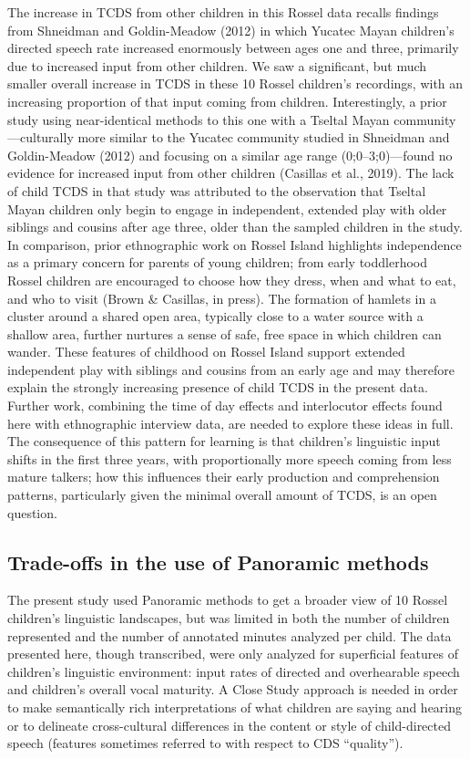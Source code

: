 \documentclass[,man,floatsintext]{apa6}
\begin{document}
The increase in TCDS from other children in this Rossel data recalls
findings from Shneidman and Goldin-Meadow (2012) in which Yucatec Mayan
children's directed speech rate increased enormously between ages one
and three, primarily due to increased input from other children. We saw
a significant, but much smaller overall increase in TCDS in these 10
Rossel children's recordings, with an increasing proportion of that
input coming from children. Interestingly, a prior study using
near-identical methods to this one with a Tseltal Mayan
community---culturally more similar to the Yucatec community studied in
Shneidman and Goldin-Meadow (2012) and focusing on a similar age range
(0;0--3;0)---found no evidence for increased input from other children
(Casillas et al., 2019). The lack of child TCDS in that study was
attributed to the observation that Tseltal Mayan children only begin to
engage in independent, extended play with older siblings and cousins
after age three, older than the sampled children in the study. In
comparison, prior ethnographic work on Rossel Island highlights
independence as a primary concern for parents of young children; from
early toddlerhood Rossel children are encouraged to choose how they
dress, when and what to eat, and who to visit (Brown \& Casillas, in
press). The formation of hamlets in a cluster around a shared open area,
typically close to a water source with a shallow area, further nurtures
a sense of safe, free space in which children can wander. These features
of childhood on Rossel Island support extended independent play with
siblings and cousins from an early age and may therefore explain the
strongly increasing presence of child TCDS in the present data. Further
work, combining the time of day effects and interlocutor effects found
here with ethnographic interview data, are needed to explore these ideas
in full. The consequence of this pattern for learning is that children's
linguistic input shifts in the first three years, with proportionally
more speech coming from less mature talkers; how this influences their
early production and comprehension patterns, particularly given the
minimal overall amount of TCDS, is an open question.

\subsection{Trade-offs in the use of Panoramic
methods}\label{trade-offs-in-the-use-of-panoramic-methods}

The present study used Panoramic methods to get a broader view of 10
Rossel children's linguistic landscapes, but was limited in both the
number of children represented and the number of annotated minutes
analyzed per child. The data presented here, though transcribed, were
only analyzed for superficial features of children's linguistic
environment: input rates of directed and overhearable speech and
children's overall vocal maturity. A Close Study approach is needed in
order to make semantically rich interpretations of what children are
saying and hearing or to delineate cross-cultural differences in the
content or style of child-directed speech (features sometimes referred
to with respect to CDS \enquote{quality}).
\end{document}
